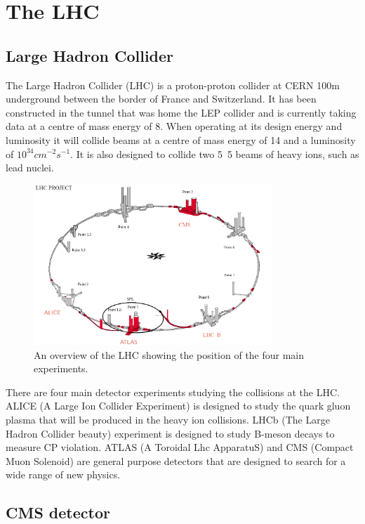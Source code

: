 \chapter{The LHC}
\section{Large Hadron Collider}
The Large Hadron Collider (LHC) is a proton-proton collider at CERN 100m
underground between the border of France and Switzerland.
It has been constructed in the tunnel that was home the LEP collider and is
currently taking data at a centre of mass energy of \unit{8}{\TeV}. 
When operating at its design energy and luminosity it will collide beams at a
centre of mass energy of \unit{14}{\TeV} and a luminosity of $10^34
cm^{-2}s^{-1}$.  
It is also designed to collide two \unit{5.5}{\TeV} beams of heavy ions, such
as lead nuclei.\cite{lhc}

\begin{figure}[htb!]
  \centering
  \includegraphics[width=0.8\textwidth]{LHC}
  \caption{An overview of the LHC showing the position of the four main experiments.}
  \label{fig:LHC}
\end{figure}

There are four main detector experiments studying the collisions at the LHC. 
ALICE (A Large Ion Collider Experiment) is designed to study the quark gluon
plasma that will be produced in the heavy ion collisions. 
LHCb (The Large Hadron Collider beauty) experiment is designed to study B-meson
decays to measure CP violation. 
ATLAS (A Toroidal Lhc ApparatuS) and CMS (Compact Muon Solenoid) are general
purpose detectors that are designed 
to search for a wide range of new physics.\cite{lhc}

\section{CMS detector}

